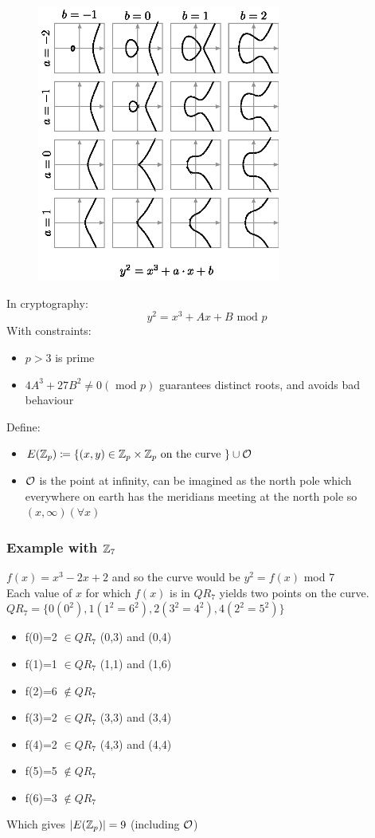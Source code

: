 \documentclass[12pt]{article}
\begin{document}
\begin{figure}[ht]
    \centering
    \includegraphics[width=8cm]{figures/ec_curves.png}
\end{figure}

In cryptography:
\begin{equation*}
y^2 = x^3+Ax+B \text{ mod }p
\end{equation*}
With constraints:
\begin{itemize}
\item $p>3$ is prime
\item $4A^3+27B^2 \neq 0 (\text{ mod }p)$ guarantees distinct roots, and avoids bad behaviour
\end{itemize}
Define:
\begin{itemize}
\item $E(\mathbb{Z}_p)\coloneqq \{(x,y) \in \mathbb{Z}_p \times \mathbb{Z}_p \text{ on the curve }\} \cup \mathcal{O}$
\item $\mathcal{O}$ is the point at infinity, can be imagined as the north pole which everywhere on earth has the meridians meeting at the north pole so $ (x, \infty) (\forall x)$
\end{itemize}
\newpage
\subsubsection{Example with $\mathbb{Z}_7$}
$f(x)=x^3-2x+2$ and so the curve would be $y^2 = f(x)$  mod 7\\
Each value of $x$ for which $f(x)$ is in $QR_7$ yields two points on the curve.\\
$QR_7 = \{0 (0^2),1 (1^2=6^2), 2 (3^2=4^2),4 (2^2=5^2)\}$
\begin{itemize}
\item f(0)=2 $\in QR_7$ (0,3) and (0,4)
\item f(1)=1 $\in QR_7$ (1,1) and (1,6)
\item f(2)=6 $\notin QR_7$
\item f(3)=2 $\in QR_7$ (3,3) and (3,4)
\item f(4)=2 $\in QR_7$ (4,3) and (4,4)
\item f(5)=5 $\notin QR_7$
\item f(6)=3 $\notin QR_7$
\end{itemize}
Which gives $|E(\mathbb{Z}_p)|=9$ (including $\mathcal{O}$)\\
\end{document}
